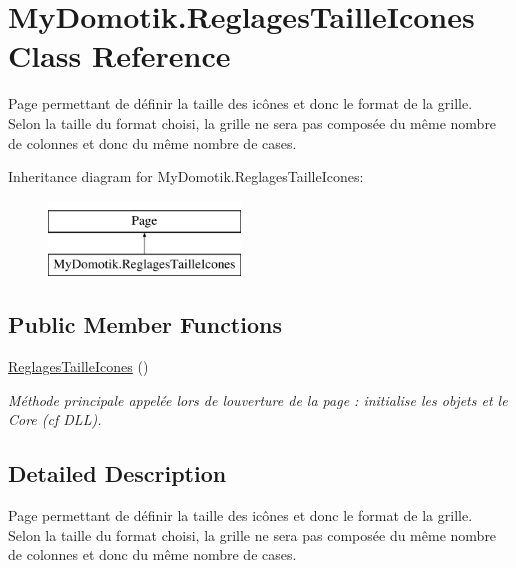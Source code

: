 \hypertarget{class_my_domotik_1_1_reglages_taille_icones}{}\section{My\+Domotik.\+Reglages\+Taille\+Icones Class Reference}
\label{class_my_domotik_1_1_reglages_taille_icones}


Page permettant de définir la taille des icônes et donc le format de la grille. ~\newline
Selon la taille du format choisi, la grille ne sera pas composée du même nombre de colonnes et donc du même nombre de cases.  


Inheritance diagram for My\+Domotik.\+Reglages\+Taille\+Icones\+:\begin{figure}[H]
\begin{center}
\leavevmode
\includegraphics[height=2.000000cm]{class_my_domotik_1_1_reglages_taille_icones}
\end{center}
\end{figure}
\subsection*{Public Member Functions}
\begin{DoxyCompactItemize}
\item 
\hyperlink{class_my_domotik_1_1_reglages_taille_icones_a3220f74b311c28c8be1fe596a7288479}{Reglages\+Taille\+Icones} ()
\begin{DoxyCompactList}\small\item\em Méthode principale appelée lors de l\textquotesingle{}ouverture de la page \+: initialise les objets et le Core (cf D\+LL). \end{DoxyCompactList}\end{DoxyCompactItemize}


\subsection{Detailed Description}
Page permettant de définir la taille des icônes et donc le format de la grille. ~\newline
Selon la taille du format choisi, la grille ne sera pas composée du même nombre de colonnes et donc du même nombre de cases. 



